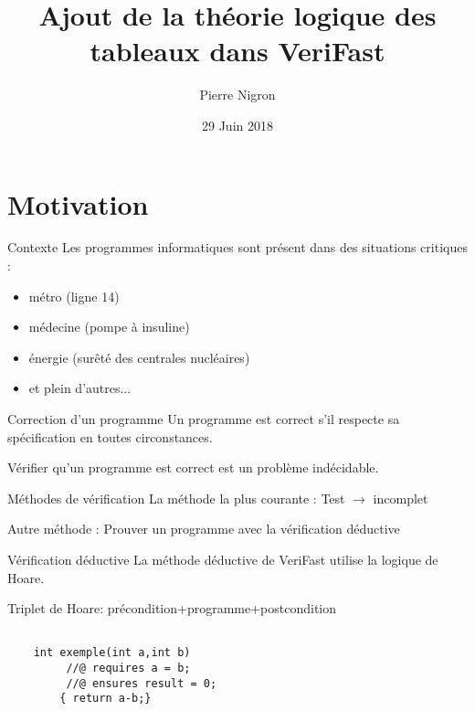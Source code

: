 \documentclass[]{beamer}
\title{Ajout de la th\'eorie logique des tableaux dans VeriFast}
\author{Pierre Nigron}
\date{29 Juin 2018}
\newcommand{\verifast}{VeriFast}
\begin{document}
\frame{\titlepage}

\begin{frame}
\tableofcontents
\end{frame}

\section{Motivation}

\begin{frame}
\tableofcontents[currentsection]
\end{frame}




\begin{frame}{Contexte}
  	Les programmes informatiques sont pr\'esent dans des situations critiques :
  	\begin{itemize}  	
  	\item m\'etro (ligne 14)
  	\item m\'edecine (pompe \`a insuline)
  	\item \'energie (sur\^et\'e des centrales nucl\'eaires)
  	\item et plein d'autres...
  	\end{itemize}
\end{frame}




\begin{frame}{Correction d'un programme}
	Un programme est correct s'il respecte sa sp\'ecification en toutes circonstances.
	
	V\'erifier qu'un programme est correct est un probl\`eme ind\'ecidable.
	
\end{frame}






\begin{frame}{M\'ethodes de v\'erification}
	La m\'ethode la plus courante : Test $\rightarrow$ incomplet
	
	Autre m\'ethode : Prouver un programme avec la v\'erification d\'eductive

\end{frame}






\begin{frame}[fragile]{V\'erification d\'eductive}
	La m\'ethode d\'eductive de \verifast{} utilise la logique de Hoare.
	
	Triplet de Hoare: pr\'econdition+programme+postcondition
	
	\begin{lstlisting}
	
	int exemple(int a,int b)
		 //@ requires a = b;
		 //@ ensures result = 0;
		{ return a-b;}
		
	\end{lstlisting}
\end{frame}
\end{document}
